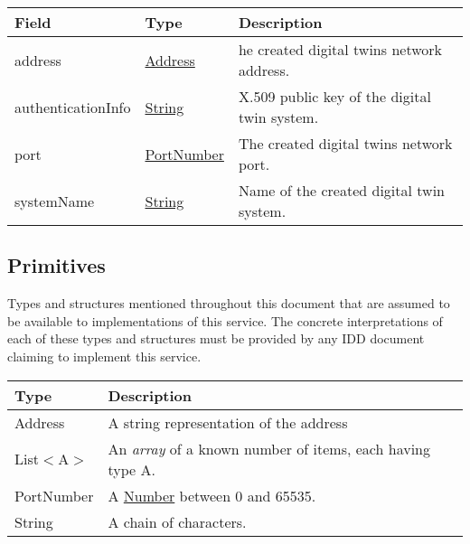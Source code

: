 \documentclass[a4paper]{arrowhead}
\newcommand{\pdef}[1]{{\textcolor{ArrowheadGrey}{#1\label{sec:model:primitives:#1}\label{sec:model:primitives:#1s}\label{sec:model:primitives:#1es}}}}
\newcommand{\pref}[1]{{\textcolor{ArrowheadGrey}{\hyperref[sec:model:primitives:#1]{#1}}}}
\begin{document}
\label{sec:model:DigitalTwinResponse}
 
\begin{table}[H]
\begin{tabularx}{\textwidth}{| p{4cm} | p{4cm} | X |} \hline
\rowcolor{gray!33} Field & Type & Description \\ \hline
address & \pref{Address} & he created digital twins network address. \\ \hline
authenticationInfo &\pref{String}  & X.509 public key of the digital twin system. \\ \hline
port & \pref{PortNumber} & The created digital twins network port. \\ \hline
systemName & \pref{String} & Name of the created digital twin system.  \\ \hline
\end{tabularx}
\end{table}

\subsection{Primitives}
\label{sec:model:primitives}

Types and structures mentioned throughout this document that are assumed to be available to implementations of this service.
The concrete interpretations of each of these types and structures must be provided by any IDD document claiming to implement this service.


\begin{table}[ht!]
\begin{tabularx}{\textwidth}{| p{3cm} | X |} \hline
\rowcolor{gray!33} Type & Description \\ \hline
\pdef{Address}          & A string representation of the address \\ \hline
\pdef{List}$<$A$>$      & An \textit{array} of a known number of items, each having type A. \\ \hline
\pdef{PortNumber}       & A \pref{Number} between 0 and 65535. \\ \hline
\pdef{String}           & A chain of characters. \\ \hline
\end{tabularx}
\end{table}

\newpage




\newpage
\end{document}
